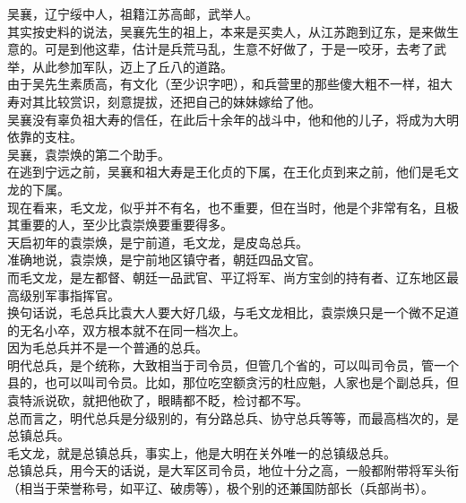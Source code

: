 \begin{multicols}{\theparacolNo}
吴襄，辽宁绥中人，祖籍江苏高邮，武举人。\\

其实按史料的说法，吴襄先生的祖上，本来是买卖人，从江苏跑到辽东，是来做生意的。可是到他这辈，估计是兵荒马乱，生意不好做了，于是一咬牙，去考了武举，从此参加军队，迈上了丘八的道路。\\

由于吴先生素质高，有文化（至少识字吧），和兵营里的那些傻大粗不一样，祖大寿对其比较赏识，刻意提拔，还把自己的妹妹嫁给了他。\\

吴襄没有辜负祖大寿的信任，在此后十余年的战斗中，他和他的儿子，将成为大明依靠的支柱。\\

吴襄，袁崇焕的第二个助手。\\

在逃到宁远之前，吴襄和祖大寿是王化贞的下属，在王化贞到来之前，他们是毛文龙的下属。\\

现在看来，毛文龙，似乎并不有名，也不重要，但在当时，他是个非常有名，且极其重要的人，至少比袁崇焕要重要得多。\\

天启初年的袁崇焕，是宁前道，毛文龙，是皮岛总兵。\\

准确地说，袁崇焕，是宁前地区镇守者，朝廷四品文官。\\

而毛文龙，是左都督、朝廷一品武官、平辽将军、尚方宝剑的持有者、辽东地区最高级别军事指挥官。\\

换句话说，毛总兵比袁大人要大好几级，与毛文龙相比，袁崇焕只是一个微不足道的无名小卒，双方根本就不在同一档次上。\\

因为毛总兵并不是一个普通的总兵。\\

明代总兵，是个统称，大致相当于司令员，但管几个省的，可以叫司令员，管一个县的，也可以叫司令员。比如，那位吃空额贪污的杜应魁，人家也是个副总兵，但袁特派说砍，就把他砍了，眼睛都不眨，检讨都不写。\\

总而言之，明代总兵是分级别的，有分路总兵、协守总兵等等，而最高档次的，是总镇总兵。\\

毛文龙，就是总镇总兵，事实上，他是大明在关外唯一的总镇级总兵。\\

总镇总兵，用今天的话说，是大军区司令员，地位十分之高，一般都附带将军头衔（相当于荣誉称号，如平辽、破虏等），极个别的还兼国防部长（兵部尚书）。\\


\end{multicols}
